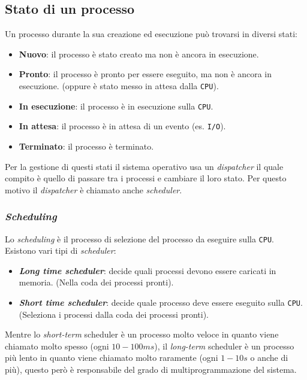     \subsection{Stato di un processo}
        Un processo durante la sua creazione ed esecuzione può trovarsi in diversi stati:
        \begin{itemize}
            \item \textbf{Nuovo}: il processo è stato creato ma non è ancora in esecuzione.
            \item \textbf{Pronto}: il processo è pronto per essere eseguito, ma non è ancora in esecuzione. (oppure è stato messo in attesa dalla \texttt{CPU}).
            \item \textbf{In esecuzione}: il processo è in esecuzione sulla \texttt{CPU}.
            \item \textbf{In attesa}: il processo è in attesa di un evento (es. \texttt{I/O}).
            \item \textbf{Terminato}: il processo è terminato.
        \end{itemize}
        Per la gestione di questi stati il sistema operativo usa un \textit{dispatcher} il quale compito è quello di passare tra i processi e cambiare il loro stato. Per questo motivo il \textit{dispatcher} è chiamato anche \textit{scheduler}.
        \subsubsection{\textit{Scheduling}}
            Lo \textit{scheduling} è il processo di selezione del processo da eseguire sulla \texttt{CPU}. Esistono vari tipi di \textit{scheduler}:
            \begin{itemize}
                \item \textbf{\textit{Long time scheduler}}: decide quali processi devono essere caricati in memoria. (Nella coda dei processi pronti).
                \item \textbf{\textit{Short time scheduler}}: decide quale processo deve essere eseguito sulla \texttt{CPU}. (Seleziona i processi dalla coda dei processi pronti).
            \end{itemize}
            Mentre lo \textit{short-term} scheduler è un processo molto veloce in quanto viene chiamato molto spesso (ogni $10-100 ms$), il \textit{long-term} scheduler è un processo più lento in quanto viene chiamato molto raramente (ogni $1-10 s$ o anche di più), questo però è responsabile del grado di multiprogrammazione del sistema. 
